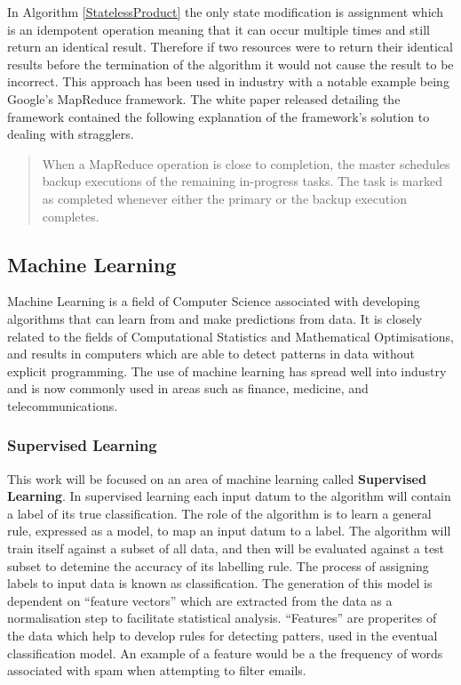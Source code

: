 \documentclass[12pt]{article}
\begin{document}
In Algorithm \ref{StatelessProduct} the only state modification is assignment which is an idempotent operation meaning that it can occur multiple times and still return an identical result. Therefore if two resources were to return their identical results before the termination of the algorithm it would not cause the result to be incorrect.
\newline
This approach has been used in industry with a notable example being Google's MapReduce framework. The white paper released detailing the framework \cite{dean2008mapreduce} contained the following explanation of the framework's solution to dealing with stragglers.

\blockquote{When a MapReduce operation is close
to completion, the master schedules backup executions
of the remaining in-progress tasks. The task is marked
as completed whenever either the primary or the backup
execution completes.}

\newpage

\subsection{Machine Learning}
Machine Learning is a field of Computer Science associated with developing algorithms that can learn from and make predictions from data\cite{machineLearningDef}. It is closely related to the fields of Computational Statistics and Mathematical Optimisations, and results in computers which are able to detect patterns in data without explicit programming. The use of machine learning has spread well into industry and is now commonly used in areas such as finance, medicine, and telecommunications.
\newline
\subsubsection{Supervised Learning}
This work will be focused on an area of machine learning called \textbf{Supervised Learning}. In supervised learning each input datum to the algorithm will contain a label of its true classification. The role of the algorithm is to learn a general rule, expressed as a model, to map an input datum to a label. The algorithm will train itself against a subset of all data, and then will be evaluated against a test subset to detemine the accuracy of its labelling rule. The process of assigning labels to input data is known as classification.
\newline
\newline
The generation of this model is dependent on ``feature vectors'' which are extracted from the data as a normalisation step to facilitate statistical analysis. ``Features'' are properites of the data which help to develop rules for detecting patters, used in the eventual classification model. An example of a feature would be a the frequency of words associated with spam when attempting to filter emails.
\newline
\end{document}

